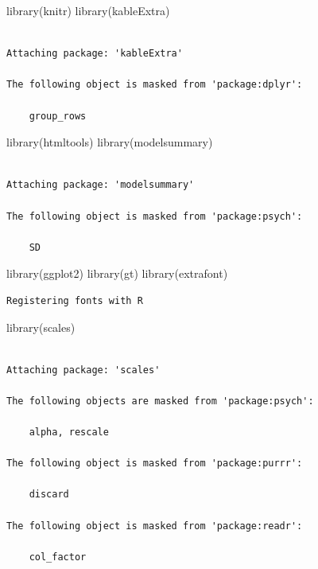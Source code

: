 \documentclass[
  letterpaper,
  DIV=11,
  numbers=noendperiod]{scrartcl}
\newenvironment{Shaded}{\begin{snugshade}}{\end{snugshade}}
\newcommand{\FunctionTok}[1]{\textcolor[rgb]{0.28,0.35,0.67}{#1}}
\newcommand{\NormalTok}[1]{\textcolor[rgb]{0.00,0.23,0.31}{#1}}
\begin{document}
\begin{Shaded}
\begin{Highlighting}[]
\FunctionTok{library}\NormalTok{(knitr)}
\FunctionTok{library}\NormalTok{(kableExtra)}
\end{Highlighting}
\end{Shaded}

\begin{verbatim}

Attaching package: 'kableExtra'

The following object is masked from 'package:dplyr':

    group_rows
\end{verbatim}

\begin{Shaded}
\begin{Highlighting}[]
\FunctionTok{library}\NormalTok{(htmltools)}
\FunctionTok{library}\NormalTok{(modelsummary)}
\end{Highlighting}
\end{Shaded}

\begin{verbatim}

Attaching package: 'modelsummary'

The following object is masked from 'package:psych':

    SD
\end{verbatim}

\begin{Shaded}
\begin{Highlighting}[]
\FunctionTok{library}\NormalTok{(ggplot2)}
\FunctionTok{library}\NormalTok{(gt)}
\FunctionTok{library}\NormalTok{(extrafont)  }
\end{Highlighting}
\end{Shaded}

\begin{verbatim}
Registering fonts with R
\end{verbatim}

\begin{Shaded}
\begin{Highlighting}[]
\FunctionTok{library}\NormalTok{(scales)}
\end{Highlighting}
\end{Shaded}

\begin{verbatim}

Attaching package: 'scales'

The following objects are masked from 'package:psych':

    alpha, rescale

The following object is masked from 'package:purrr':

    discard

The following object is masked from 'package:readr':

    col_factor
\end{verbatim}
\end{document}
